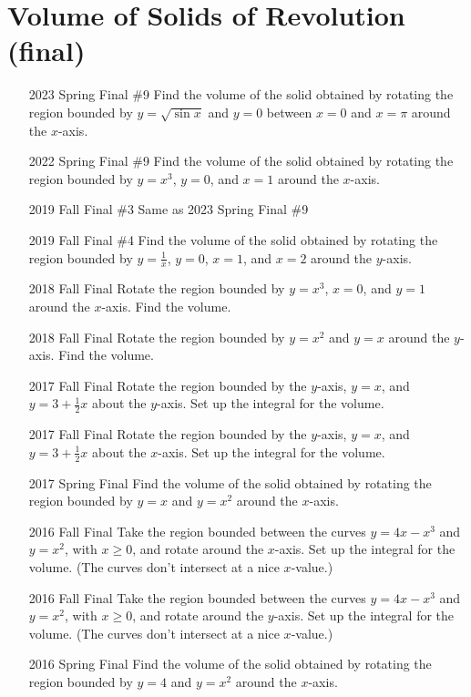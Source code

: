 \documentclass[10pt]{scrartcl}
\theoremstyle{definition}
\begin{document}
\section{Volume of Solids of Revolution (final)}
\begin{enumerate}
\item[2023 Spring Final \#9] Find the volume of the solid obtained by rotating the region bounded by $y=\sqrt{\sin x}$ and $y=0$ between $x=0$ and $x=\pi$ around the $x$-axis.
\item[2022 Spring Final \#9] Find the volume of the solid obtained by rotating the region bounded by $y=x^3$, $y=0$, and $x=1$ around the $x$-axis.
\item[2019 Fall Final \#3] Same as 2023 Spring Final \#9 %
\item[2019 Fall Final \#4] Find the volume of the solid obtained by rotating the region bounded by $y=\frac1x$, $y=0$, $x=1$, and $x=2$ around the $y$-axis.
\item[2018 Fall Final] Rotate the region bounded by $y=x^3$, $x = 0$, and $y = 1$ around the $x$-axis. Find the volume.
\item[2018 Fall Final] Rotate the region bounded by $y=x^2$ and $y = x$ around the $y$-axis. Find the volume.
\item[2017 Fall Final] Rotate the region bounded by the $y$-axis, $y=x$, and $y=3 + \frac12 x$ about the $y$-axis. Set up the integral for the volume.
\item[2017 Fall Final] Rotate the region bounded by the $y$-axis, $y=x$, and $y=3 + \frac12 x$ about the $x$-axis. Set up the integral for the volume.
\item[2017 Spring Final] Find the volume of the solid obtained by rotating the region bounded by $y = x$ and $y = x^2$ around the $x$-axis.
\item[2016 Fall Final] Take the region bounded between the curves $y = 4x - x^3$ and $y = x^2$, with $x \ge 0$, and rotate around the $x$-axis. Set up the integral for the volume. (The curves don't intersect at a nice $x$-value.)
\item[2016 Fall Final] Take the region bounded between the curves $y = 4x - x^3$ and $y = x^2$, with $x \ge 0$, and rotate around the $y$-axis. Set up the integral for the volume. (The curves don't intersect at a nice $x$-value.)
\item[2016 Spring Final] Find the volume of the solid obtained by rotating the region bounded by $y = 4$ and $y = x^2$ around the $x$-axis.
\end{enumerate}
\end{document}
